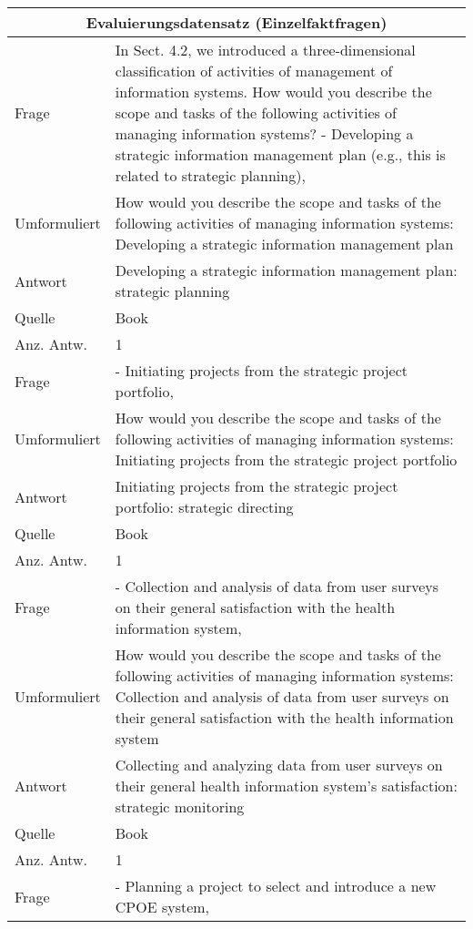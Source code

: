 \begin{landscape}
\begin{longtable}{p{3cm}p{}}
    \toprule
    \multicolumn{2}{c}{\textbf{Evaluierungsdatensatz (Einzelfaktfragen)}}\\
    \midrule
    Frage & In Sect. 4.2, we introduced a three-dimensional classification of activities of management of information systems.
    How would you describe the scope and tasks of the following activities of managing information systems? - Developing a strategic information management plan (e.g., this is related to strategic planning), \\
    Umformuliert & How would you describe the scope and tasks of the following activities of managing information systems: Developing a strategic information management plan \\
    Antwort & Developing a strategic information management plan: strategic planning \\
    Quelle & Book \\
    Anz. Antw.& 1 \\
    \midrule
    Frage & - Initiating projects from the strategic project portfolio, \\
    Umformuliert & How would you describe the scope and tasks of the following activities of managing information systems: Initiating projects from the strategic project portfolio \\
    Antwort & Initiating projects from the strategic project portfolio: strategic directing \\
    Quelle & Book \\
    Anz. Antw.& 1 \\
    \midrule
    Frage & - Collection and analysis of data from user surveys on their general satisfaction with the health information system, \\
    Umformuliert & How would you describe the scope and tasks of the following activities of managing information systems: Collection and analysis of data from user surveys on their general satisfaction with the health information system \\
    Antwort & Collecting and analyzing data from user surveys on their general health information system's satisfaction: strategic monitoring \\
    Quelle & Book \\
    Anz. Antw.& 1 \\
    \midrule
    Frage & - Planning a project to select and introduce a new CPOE system, \\

\end{longtable}
\end{landscape}
